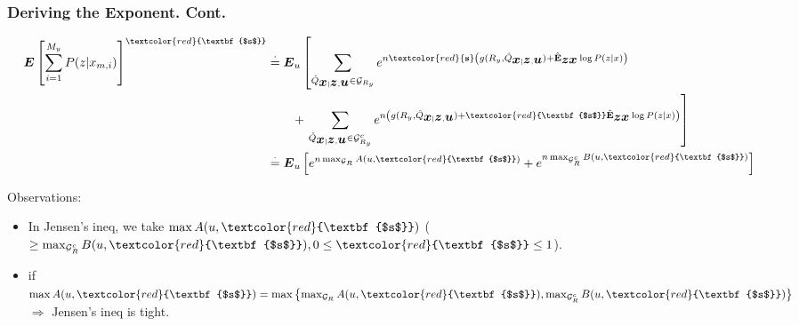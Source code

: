 \documentclass[mathserif]{beamer}
\newcommand {\exe} {\stackrel{\cdot} {=}}
\newcommand {\bu} {\mbox{\boldmath $u$}}
\newcommand {\bx} {\mbox{\boldmath $x$}}
\newcommand {\bz} {\mbox{\boldmath $z$}}
\newcommand {\bE} {\mbox{\boldmath $E$}}
\newcommand{\calG}{{\cal G}}
\newcommand {\bhE}{\hat{\textbf{E}}}
\newcommand {\hQ}{\hat{Q}}
\newcommand{\lb}{\left(}
\newcommand{\rb}{\right)}
\begin{document}
\begin{frame}
\frametitle{Deriving the Exponent. Cont.}
\begin{block}{}
\begin{align*}
    \bE\left[\sum_{i=1}^{M_y}P(z|x_{m,i})\right]^{\textcolor{red}{\textbf{$s$}}}
    &\exe \bE_u \left[
    \sum_{\hQ_{\bx|\bz,\bu}\in \calG_{R_y}}e^{n\textcolor{red}{\textbf{s}}\lb g(R_y, \hQ_{\bx|\bz,\bu})+\bhE_{\bz\bx}\log
    P(z|x)\rb}\right.\\
    &~~~~~~+\left.\sum_{\hQ_{\bx|\bz,\bu}\in \calG^c_{R_y}}e^{n\lb g(R_y, \hQ_{\bx|\bz,\bu})+\textcolor{red}{\textbf{$s$}}\bhE_{\bz\bx}\log
    P(z|x)\rb}\right]\\
    &\exe \bE_u\left[e^{n\max_{\calG_R}A(u,\textcolor{red}{\textbf{$s$}})}+e^{n\max_{\calG^c_R}B(u,\textcolor{red}{\textbf{$s$}})} \right]
\end{align*}
\end{block}
\begin{exampleblock}{Observations:}
\begin{itemize}
\item In Jensen's ineq, we take $\max A(u,\textcolor{red}{\textbf{$s$}})$ ($\geq \max_{\calG^c_R}B(u,\textcolor{red}{\textbf{$s$}}),0\leq\textcolor{red}{\textbf{$s$}}\leq 1$).
\item if $\max A(u,\textcolor{red}{\textbf{$s$}})=\max\left\{\max_{\calG_R}A(u,\textcolor{red}{\textbf{$s$}}), \max_{\calG^c_R}B(u,\textcolor{red}{\textbf{$s$}})\right\}$ $\Rightarrow$ Jensen's ineq is tight.
\end{itemize}
\end{exampleblock}

\end{frame}
\end{document}
